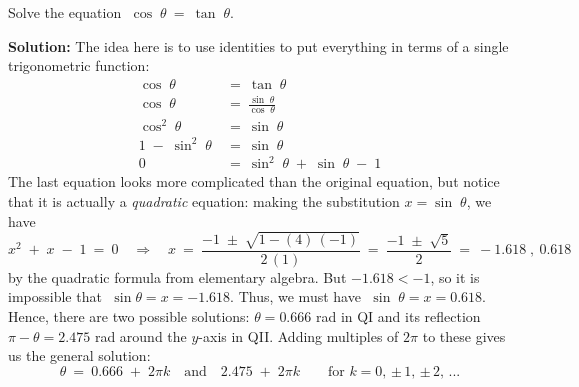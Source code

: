 \begin{exmp}
 Solve the equation $\;\cos\;\theta ~=~ \tan\;\theta$.\vspace{1mm}
 \par\noindent\textbf{Solution:} The idea here is to use identities to put everything in terms of a
 single trigonometric function:
 \begin{align*}
  \cos\;\theta ~&=~ \tan\;\theta\\
  \cos\;\theta ~&=~ \frac{\sin\;\theta}{\cos\;\theta}\\
  \cos^2 \;\theta ~&=~ \sin\;\theta\\
  1 \;-\; \sin^2 \;\theta ~&=~ \sin\;\theta\\
  0 ~&=~ \sin^2 \;\theta \;+\; \sin\;\theta \;-\; 1
 \end{align*}
 The last equation looks more complicated than the original equation, but notice
 that it is actually a \emph{quadratic} equation: making the substitution $x=\sin\;\theta$, we have
 \begin{displaymath}
  x^2 \;+\; x \;-\; 1 ~=~ 0 \quad\Rightarrow\quad x ~=~ \frac{-1 \;\pm\; \sqrt{1 - (4)\,(-1)}}{
   2\,(1)} ~=~ \frac{-1 \;\pm\; \sqrt{5}}{2} ~=~ -1.618\;,~0.618
 \end{displaymath}
 by the quadratic formula from elementary algebra. But $-1.618 < -1$, so it is impossible that
 $\;\sin\theta = x = -1.618$. Thus, we must have $\;\sin\;\theta = x = 0.618$. Hence, there are two
 possible solutions: $\theta = 0.666 $ rad in QI and its reflection $\pi - \theta = 2.475$
 rad around the $y$-axis in QII. Adding multiples of $2\pi$ to these gives us the general solution:
 \begin{displaymath}
  \boxed{\theta ~=~ 0.666 \;+\; 2\pi k \quad\text{and}\quad 2.475 \;+\; 2\pi k}
  \qquad\text{for $k=0$, $\pm\,1$, $\pm\,2$, $...$}
 \end{displaymath}
\end{exmp}
\divider
\newpage
